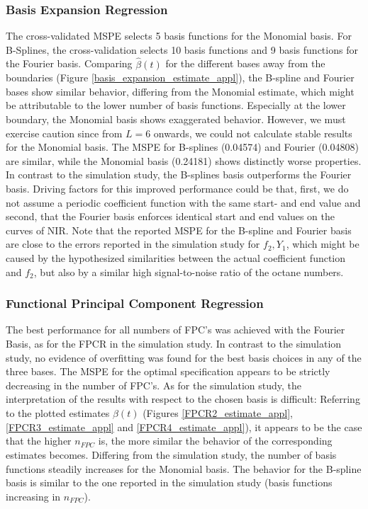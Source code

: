\documentclass[11pt,twoside,a4paper]{article}
\begin{document}
		\subsubsection{Basis Expansion Regression}
		The cross-validated MSPE selects 5 basis functions for the Monomial basis. For B-Splines, the cross-validation selects 10 basis functions and 9 basis functions for the Fourier basis. Comparing $\hat{\beta}(t)$ for the different bases away from the boundaries (Figure \ref{basis_expansion_estimate_appl}), the B-spline and Fourier bases show similar behavior, differing from the Monomial estimate, which might be attributable to the lower number of basis functions. Especially at the lower boundary, the Monomial basis shows exaggerated behavior. However, we must exercise caution since from $L=6$ onwards, we could not calculate stable results for the Monomial basis. The MSPE for B-splines (0.04574) and Fourier (0.04808) are similar, while the Monomial basis (0.24181) shows distinctly worse properties. 
		In contrast to the simulation study, the B-splines basis outperforms the Fourier basis. Driving factors for this improved performance could be that, first, we do not assume a periodic coefficient function with the same start- and end value and second, that the Fourier basis enforces identical start and end values on the curves of NIR. Note that the reported MSPE for the B-spline and Fourier basis are close to the errors reported in the simulation study for $f_2,Y_1$, which might be caused by the hypothesized similarities between the actual coefficient function and $f_2$, but also by a similar high signal-to-noise ratio of the octane numbers. 
	
		\subsubsection{Functional Principal Component Regression}
		The best performance for all numbers of FPC's was achieved with the Fourier Basis, as for the FPCR in the simulation study. In contrast to the simulation study, no evidence of overfitting was found for the best basis choices in any of the three bases. The MSPE for the optimal specification appears to be strictly decreasing in the number of FPC's. As for the simulation study, the interpretation of the results with respect to the chosen basis is difficult: Referring to the plotted estimates $\hat{\beta}(t)$ (Figures \ref{FPCR2_estimate_appl}, \ref{FPCR3_estimate_appl} and \ref{FPCR4_estimate_appl}), it appears to be the case that the higher $n_{FPC}$ is, the more similar the behavior of the corresponding estimates becomes. Differing from the simulation study, the number of basis functions steadily increases for the Monomial basis. The behavior for the B-spline basis is similar to the one reported in the simulation study (basis functions increasing in $n_{FPC}$). 
	
\end{document}
